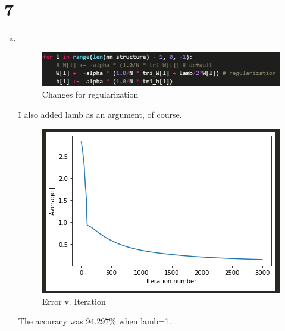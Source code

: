 \documentclass[12pt]{article}
\begin{document}
\section*{7}
\begin{enumerate}[(a)]
	\item \,
		\begin{figure}[H]
			\centering
			\includegraphics[width=\textwidth/2]{images/7achange.png}
			\caption{Changes for regularization}
			\label{fig:7:a:change}
		\end{figure}
		I also added lamb as an argument, of course.
		\begin{figure}[H]
			\centering
			\includegraphics[width=\textwidth/2]{images/7agraph.png}
			\caption{Error v. Iteration}
			\label{fig:7:a:J}
		\end{figure}
		The accuracy was 94.297\% when lamb=1.
	

\end{enumerate}
\end{document}
